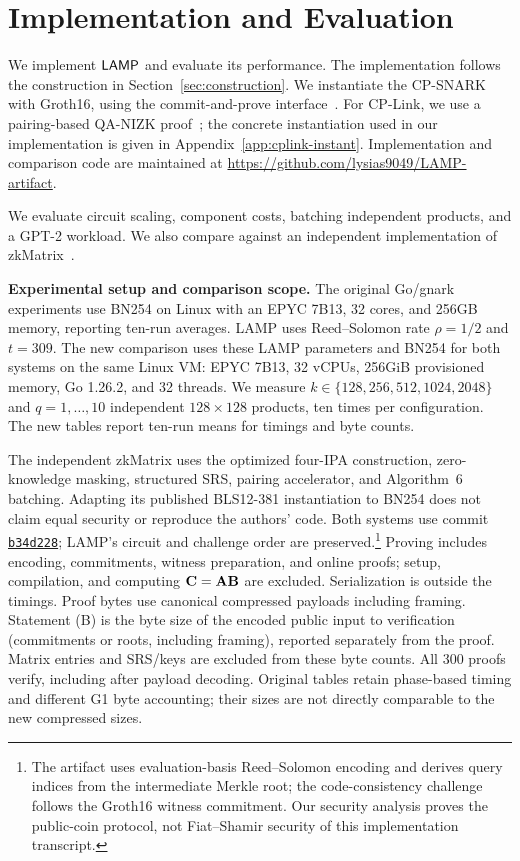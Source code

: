 \section{Implementation and Evaluation}
\label{sec:implementation}

We implement \(\textsf{LAMP}\) and evaluate its performance. The implementation follows the construction in Section~\ref{sec:construction}.  We instantiate the CP-SNARK with Groth16, using the commit-and-prove
interface~\cite{gnark,legosnark}.  For CP-Link, we use a pairing-based QA-NIZK
proof~\cite{qa-nizk}; the concrete instantiation used in our implementation is
given in Appendix~\ref{app:cplink-instant}. Implementation and comparison code
are maintained at \url{https://github.com/lysias9049/LAMP-artifact}.

We evaluate circuit scaling, component costs, batching independent products,
and a GPT-2 workload. We also compare against an independent implementation
of zkMatrix~\cite{cong2024zkmatrix}.

\noindent\textbf{Experimental setup and comparison scope.}
The original Go/gnark experiments use BN254 on Linux with an EPYC 7B13,
32 cores, and 256GB memory, reporting ten-run averages. LAMP uses
Reed--Solomon rate \(\rho=1/2\) and \(t=309\). The new comparison uses these
LAMP parameters and BN254 for both systems on the same Linux VM: EPYC 7B13,
32 vCPUs, 256GiB provisioned memory, Go 1.26.2, and 32 threads. We measure
\(k\in\{128,256,512,1024,2048\}\) and \(q=1,\ldots,10\) independent
\(128\times128\) products, ten times per configuration. The new tables report
ten-run means for timings and byte counts.

The independent zkMatrix uses the optimized four-IPA construction,
zero-knowledge masking, structured SRS, pairing accelerator, and Algorithm~6
batching. Adapting its published BLS12-381 instantiation to BN254 does not
claim equal security or reproduce the authors' code. Both systems use commit
\href{https://github.com/lysias9049/LAMP-artifact/tree/b34d2287c30730a3990d92630185a0a792a2897f}{\texttt{b34d228}};
LAMP's circuit and challenge order are preserved.\footnote{The artifact uses
evaluation-basis Reed--Solomon encoding and derives query indices from the
intermediate Merkle root; the code-consistency challenge follows the Groth16
witness commitment. Our security analysis proves the public-coin protocol,
not Fiat--Shamir security of this implementation transcript.}
Proving includes encoding, commitments, witness preparation, and online proofs;
setup, compilation, and computing \(\mathbf C=\mathbf A\mathbf B\) are excluded.
Serialization is outside the timings. Proof bytes use canonical compressed
payloads including framing. Statement (B) is the byte size of the encoded
public input to verification (commitments or roots, including framing),
reported separately from the proof. Matrix entries and SRS/keys are excluded
from these byte counts. All 300 proofs verify, including after payload decoding. Original
tables retain phase-based timing and different G1 byte accounting; their sizes
are not directly comparable to the new compressed sizes.

